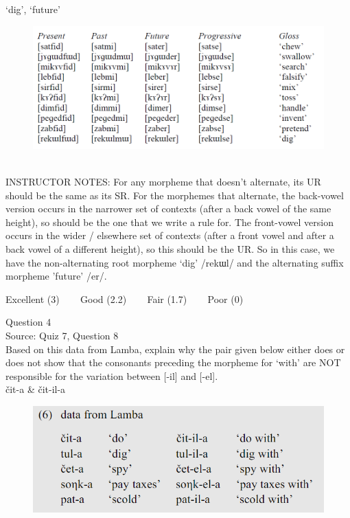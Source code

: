 \documentclass[12pt]{article}
\begin{document}
`dig', `future'

\begin{figure}[H]
\includegraphics{../images/final_dataset.png}
\end{figure}

~\\
INSTRUCTOR NOTES: For any morpheme that doesn’t alternate, its UR should be the same as its SR.  For the morphemes that alternate, the back-vowel version occurs in the narrower set of contexts (after a back vowel of the same height), so should be the one that we write a rule for. The front-vowel version occurs in the wider / elsewhere set of contexts (after a front vowel and after a back vowel of a different height), so this should be the UR. So in this case, we have the non-alternating root morpheme ‘dig’ /rekɯl/ and the alternating suffix morpheme 'future' /er/.


\vfill
Excellent (3) ~~~ Good (2.2) ~~~ Fair (1.7) ~~~ Poor (0)
\newpage

{\large Question 4}\\

Source: Quiz 7, Question 8\\

Based on this data from Lamba, explain why the pair given below either does or does not show that the consonants preceding the morpheme for `with' are NOT responsible for the variation between [-il] and [-el].\\

čit-a \& čit-il-a

\begin{figure}[H]
\includegraphics{../images/peng119_lamba.png}
\end{figure}
\end{document}
